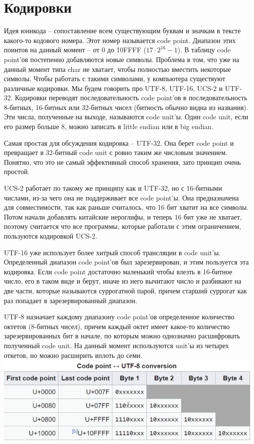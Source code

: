 \documentclass[12pt, a4paper]{article}
\begin{document}
\section{Кодировки}
Идея юникода -- сопоставление всем существующим буквам и значкам в тексте какого-то кодового номера. Этот номер называется code point. Диапазон этих поинтов на данный момент -- от 0 до 10FFFF ($17\cdot 2^{16} - 1$). В таблицу code point'ов постепенно добавляются новые символы. Проблема в том, что уже на данный момент типа char не хватает, чтобы полностью вместить некоторые символы. Чтобы работать с такими символами, у компьютера существуют различные кодировки. Мы будем говорить про UTF-8, UTF-16, UCS-2 и UTF-32. Кодировки переводят последовательность code point'ов в последовательность 8-битных, 16-битных или 32-битных чисел (битность обычно видна из названия). Эти числа, полученные на выходе, называются code unit'ы. Один code unit, если его размер больше 8, можно записать в little endian или в big endian.
\par Самая простая для обсуждения кодировка -- UTF-32. Она берет code point и превращает в 32-битный code unit с ровно таким же числовым значением. Понятно, что это не самый эффективный способ хранения, зато принцип очень простой.
\par UCS-2 работает по такому же принципу как и UTF-32, но с 16-битными числами, из-за чего она не поддерживает все code point'ы. Она предназначена для совместимости, так как раньше считалось, что 16 бит хватит на все символы. Потом начали добавлять китайские иероглифы, и теперь 16 бит уже не хватает, поэтому считается что все программы, которые работали с этим ограничением, пользуются кодировкой UCS-2.
\par UTF-16 уже использует более хитрый способ трансляции в code unit'ы. Определенный диапазон code point'ов был зарезервирован, и этим пользуется эта кодировка. Если code point достаточно маленький чтобы влезть в 16-битное число, его в таком виде и берут, иначе из него вычитают число и разбивают на две части, которые называются суррогатной парой, причем старший суррогат как раз попадает в зарезервированный диапазон.
\par UTF-8 назначает каждому диапазону code point'ов определенное количество октетов (8-битных чисел), причем каждый октет имеет какое-то количество зарезервированных бит в начале, по которым можно однозначно расшифровать полученный code unit. На данный момент используются unit'ы из четырех откетов, но можно расширить вплоть до семи.\\
\includegraphics[scale=0.7]{utf8.png}\\
\end{document}
